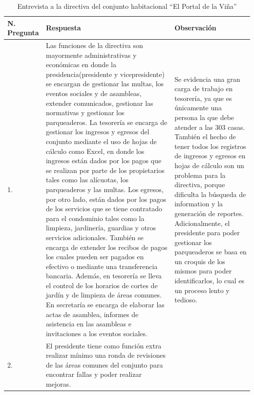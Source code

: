 \newpage
\begin{center}
    \begin{small}

    \begin{longtable}[c]{|p{} |p{} |p{}|}
        \caption{Entrevista a la directiva del conjunto habitacional {\textquotedblleft}El Portal de la Viña{\textquotedblright}}\\
        \hline
        \textbf{N. Pregunta} & \textbf{Respuesta} & \textbf{Observación}\\
        \hline
            1. & Las funciones de la directiva son mayormente administrativas y económicas en donde la presidencia(presidente y vicepresidente) se encargan de gestionar las multas, los eventos sociales y de asambleas, extender comunicados, gestionar las normativas y gestionar los parqueaderos.
            La tesorería se encarga de gestionar los ingresos y egresos del conjunto mediante el uso de hojas de cálculo como Excel, en donde los ingresos están dados por los pagos que se realizan por parte de los propietarios tales como las alícuotas, los parqueaderos y las multas.
            Los egresos, por otro lado, están dados por los pagos de los servicios que se tiene contratado para el condominio tales como la limpieza, jardinería, guardias y otros servicios adicionales.
            También se encarga de extender los recibos de pagos los cuales pueden ser pagados en efectivo o mediante una transferencia bancaria.
            Además, en tesorería se lleva el control de los horarios de cortes de jardín y de limpieza de áreas comunes.
            En secretaría se encarga de elaborar las actas de asamblea, informes de asistencia en las asambleas e invitaciones a los eventos sociales.
            & Se evidencia una gran carga de trabajo en tesorería, ya que es únicamente una persona la que debe atender a las 303 casas.
            También el hecho de tener todos los registros de ingresos y egresos en hojas de cálculo son un problema para la directiva, porque dificulta la búsqueda de information y la generación de reportes.
            Adicionalmente, el presidente para poder gestionar los parqueaderos se basa en un croquis de los mismos para poder identificarlos, lo cual es un proceso lento y tedioso.\\
        \hline
        2. & El presidente tiene como función extra realizar mínimo una ronda de revisiones de las áreas comunes del conjunto para encontrar fallas y poder realizar mejoras.

\end{longtable}
\end{small}
\end{center}

